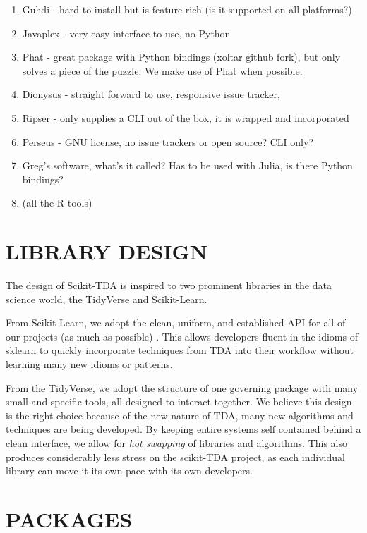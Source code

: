 \documentclass[letterpaper, 10 pt, conference]{ieeeconf}  %
\begin{document}
\begin{enumerate}
\item Guhdi - hard to install but is feature rich (is it supported on all platforms?)
\item Javaplex - very easy interface to use, no Python
\item Phat - great package with Python bindings (xoltar github fork), but only solves a piece of the puzzle. We make use of Phat when possible.
\item Dionysus - straight forward to use, responsive issue tracker, 
\item Ripser - only supplies a CLI out of the box, it is wrapped and incorporated
\item Perseus - GNU license, no issue trackers or open source? CLI only?
\item Greg's software, what's it called? Has to be used with Julia, is there Python bindings?
\item (all the R tools)
\end{enumerate}


\section{LIBRARY DESIGN}

The design of Scikit-TDA is inspired to two prominent libraries in the data science world, the TidyVerse and Scikit-Learn.  

From Scikit-Learn, we adopt the clean, uniform, and established API for all of our projects (as much as possible) \cite{scikit-learn}. This allows developers fluent in the idioms of sklearn to quickly incorporate techniques from TDA into their workflow without learning many new idioms or patterns.

From the TidyVerse, we adopt the structure of one governing package with many small and specific tools, all designed to interact together.
We believe this design is the right choice because of the new nature of TDA, many new algorithms and techniques are being developed. 
By keeping entire systems self contained behind a clean interface, we allow for \emph{hot swapping} of libraries and algorithms.  
This also produces considerably less stress on the scikit-TDA project, as each individual library can move it its own pace with its own developers.


\section{PACKAGES}
\end{document}
